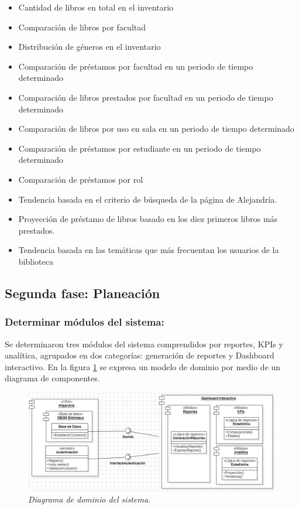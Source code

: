 \documentclass[spanish]{ieee_upb}
\begin{document}
\begin{itemize}
    \item Cantidad de libros en total en el inventario
    \item Comparación de libros por facultad
    \item Distribución de géneros en el inventario
    \item Comparación de préstamos por facultad en un periodo de tiempo determinado
    \item Comparación de libros prestados por facultad en un periodo de tiempo determinado
    \item Comparación de libros por uso en sala en un periodo de tiempo determinado
    \item Comparación de préstamos por estudiante en un periodo de tiempo determinado
    \item Comparación de préstamos por rol
    \item Tendencia basada en el criterio de búsqueda de la página de Alejandría.
    \item Proyección de préstamo de libros basado en los diez primeros libros más prestados.
    \item Tendencia basada en las temáticas que más frecuentan los usuarios de la biblioteca
\end{itemize}


\subsection{Segunda fase: Planeación}
\subsubsection{Determinar módulos del sistema: } Se determinaron tres módulos del sistema comprendidos por reportes, KPIs y analítica, agrupados en dos categorías: generación de reportes y Dashboard interactivo. En la figura \ref{fig:domain} se expresa un modelo de dominio por medio de un diagrama de componentes.


\begin{figure}[htpb] 
	\centering
	\includegraphics[width=0.9\linewidth]{img/Diagramas/dominio.png}
	\vspace{-1mm}
	\caption[Diagrama de dominio]{\textit{Diagrama de dominio del sistema.}}
	\label{fig:domain} 
\end{figure}
\end{document}
